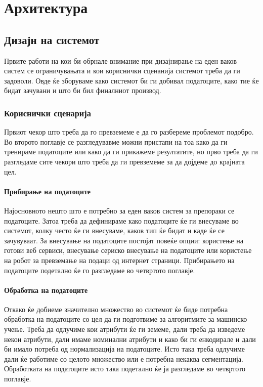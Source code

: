 \chapter{Архитектура}
\label{sec:architecture}
\section{Дизајн на системот}
Првите работи на кои би обрнале внимание при дизајнирање на еден ваков систем се ограничувањата и кои кориснички сценанија системот треба да ги задоволи. Овде ќе зборуваме како системот би ги добивал податоците, како тие ќе бидат зачувани и што би бил финалниот производ.
\subsection{Кориснички сценарија}
Првиот чекор што треба да го превземеме е да го разбереме проблемот подобро. Во второто поглавје се разгледувавме можни пристапи на тоа како да ги тренираме податоците или како да ги прикажеме резултатите, но прво треба да ги разгледаме сите чекори што треба да ги превземеме за да дојдеме до крајната цел.
\subsubsection{Прибирање на податоците}
Најосновното нешто што е потребно за еден ваков систем за препораки се податоците. Затоа треба да дефинираме како податоците ќе ги внесуваме во системот, колку често ќе ги внесуваме, каков тип ќе бидат и каде ќе се зачувуваат. За внесување на податоците постојат повеќе опции: користење на готови веб сервиси, внесување сериско внесување на податоците или користење на робот за превземање на подаци од интернет страници. Прибирањето на податоците подетално ќе го разгледаме во четвртото поглавје.
\subsubsection{Обработка на податоците}
Откако ќе добиеме значително множество во системот ќе биде потребна обработка на податоците со цел да ги подготвиме за алгоритмите за машинско учење. Треба да одлучиме кои атрибути ќе ги земеме, дали треба да изведеме некои атрибути, дали имаме номинални атрибути и како би ги енкодирале и дали би имало потреба од нормализација на податоците. Исто така треба одлучиме дали ќе работиме со целото множество или е потребна некаква сегментација. Обработката на податоците исто така подетално ќе ја разгледаме во четвртото поглавје. 

